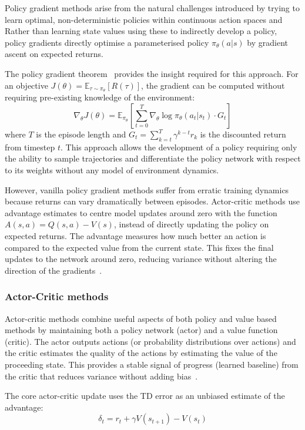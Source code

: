 Policy gradient methods arise from the natural challenges introduced by trying to learn optimal, non-deterministic policies within continuous action spaces and Rather than learning state values using these to indirectly develop a policy, policy gradients directly optimise a parameterised policy $\pi_\theta(a|s)$ by gradient ascent on expected returns.

The policy gradient theorem~\citep{sutton_1999_policy} provides the insight required for this approach. For an objective $J(\theta) = \mathbb{E}_{\tau \sim \pi_\theta}[R(\tau)]$, the gradient can be computed without requiring pre-existing knowledge of the environment:
\[
\nabla_\theta J(\theta) = \mathbb{E}_{\pi_\theta}\left[\sum_{t=0}^{T} \nabla_\theta \log \pi_\theta(a_t|s_t) \cdot G_t\right]
\]
where $T$ is the episode length and $G_t = \sum_{k=t}^{T} \gamma^{k-t} r_k$ is the discounted return from timestep $t$. This approach allows the development of a policy requiring only the ability to sample trajectories and differentiate the policy network with respect to its weights without any model of environment dynamics.

However, vanilla policy gradient methods suffer from erratic training dynamics because returns can vary dramatically between episodes. Actor-critic methods use advantage estimates to centre model updates around zero with the function $A(s,a) = Q(s,a) - V(s)$, instead of directly updating the policy on expected returns. The advantage measures how much better an action is compared to the expected value from the current state. This fixes the final updates to the network around zero, reducing variance without altering the direction of the gradients~\citep{schulman_2018_highdimensional}.


\subsubsection{Actor-Critic methods}\label{subsubsec:actor_critic}
Actor-critic methods combine useful aspects of both policy and value based methods by maintaining both a policy network (actor) and a value function (critic). The actor outputs actions (or probability distributions over actions) and the critic estimates the quality of the actions by estimating the value of the proceeding state. This provides a stable signal of progress (learned baseline) from the critic that reduces variance without adding bias~\citep{sutton_1998_reinforcement}.

The core actor-critic update uses the TD error as an unbiased estimate of the advantage:
\[
\delta_t = r_t + \gamma V(s_{t+1}) - V(s_t)
\]

